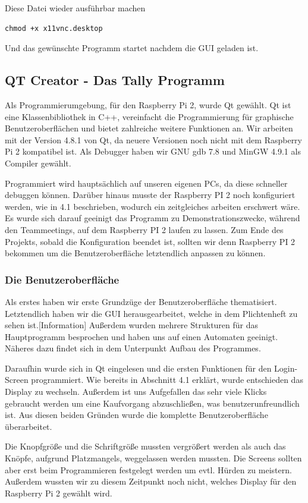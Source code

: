 \documentclass[11pt,a4paper]{article} %
\begin{document}
Diese Datei wieder ausführbar machen
\begin{frame}

\begin{lstlisting}
chmod +x x11vnc.desktop
\end{lstlisting}
\end{frame}
Und das gewünschte Programm startet nachdem die GUI geladen ist.

\newpage

\subsection{QT Creator - Das Tally Programm}
Als Programmierumgebung, für den Raspberry Pi 2, wurde Qt gewählt.
Qt ist eine Klassenbibliothek in C++, vereinfacht die Programmierung für graphische Benutzeroberflächen und bietet zahlreiche weitere Funktionen an.
Wir arbeiten mit der Version 4.8.1 von Qt, da neuere Versionen noch nicht mit dem Raspberry Pi 2 kompatibel ist.
Als Debugger haben wir GNU gdb 7.8 und MinGW 4.9.1 als Compiler gewählt.
\par
Programmiert wird hauptsächlich auf unseren eigenen PCs, da diese schneller debuggen können.
Darüber hinaus musste der Raspberry PI 2 noch konfiguriert werden, wie in 4.1 beschrieben, wodurch ein zeitgleiches arbeiten erschwert wäre.
Es wurde sich darauf geeinigt das Programm zu Demonstrationszwecke, während den Teammeetings, auf dem Raspberry PI 2 laufen zu lassen.
Zum Ende des Projekts, sobald die Konfiguration beendet ist, sollten wir denn Raspberry PI 2 bekommen um die Benutzeroberfläche letztendlich anpassen zu können.
\par
\subsubsection{Die Benutzeroberfläche}
Als erstes haben wir erste Grundzüge der Benutzeroberfläche thematisiert. Letztendlich haben wir die GUI herausgearbeitet, welche in dem Plichtenheft zu sehen ist.[Information]
Außerdem wurden mehrere Strukturen für das Hauptprogramm besprochen und haben uns auf einen Automaten geeinigt. Näheres dazu findet sich in dem Unterpunkt Aufbau des Programmes.
\par
Daraufhin wurde sich in Qt eingelesen und die ersten Funktionen für den Login-Screen programmiert.
Wie bereits in Abschnitt 4.1 erklärt, wurde entschieden das Display zu wechseln.
Außerdem ist uns Aufgefallen das sehr viele Klicks gebraucht werden um eine Kaufvorgang abzuschließen, was benutzerunfreundlich ist.
Aus diesen beiden Gründen wurde die komplette Benutzeroberfläche überarbeitet.
\par
Die Knopfgröße und die Schriftgröße mussten vergrößert werden als auch das Knöpfe, aufgrund Platzmangels, weggelassen werden mussten.
Die Screens sollten aber erst beim Programmieren festgelegt werden um evtl. Hürden zu meistern.
Außerdem wussten wir zu diesem Zeitpunkt noch nicht, welches Display für den Raspberry Pi 2 gewählt wird.
\par
\end{document}

